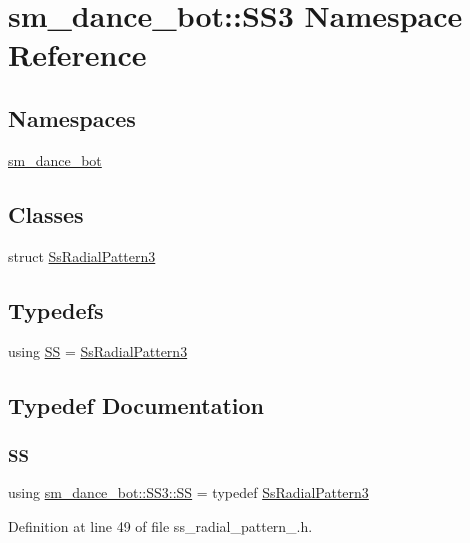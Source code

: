 \hypertarget{namespacesm__dance__bot_1_1SS3}{}\section{sm\+\_\+dance\+\_\+bot\+:\+:S\+S3 Namespace Reference}
\label{namespacesm__dance__bot_1_1SS3}
\subsection*{Namespaces}
\begin{DoxyCompactItemize}
\item 
 \hyperlink{namespacesm__dance__bot_1_1SS3_1_1sm__dance__bot}{sm\+\_\+dance\+\_\+bot}
\end{DoxyCompactItemize}
\subsection*{Classes}
\begin{DoxyCompactItemize}
\item 
struct \hyperlink{structsm__dance__bot_1_1SS3_1_1SsRadialPattern3}{Ss\+Radial\+Pattern3}
\end{DoxyCompactItemize}
\subsection*{Typedefs}
\begin{DoxyCompactItemize}
\item 
using \hyperlink{namespacesm__dance__bot_1_1SS3_aba7ea37bc21bc69fc2c374bd831c7ab1}{SS} = \hyperlink{structsm__dance__bot_1_1SS3_1_1SsRadialPattern3}{Ss\+Radial\+Pattern3}
\end{DoxyCompactItemize}


\subsection{Typedef Documentation}
\mbox{\label{namespacesm__dance__bot_1_1SS3_aba7ea37bc21bc69fc2c374bd831c7ab1}} 
\subsubsection{\texorpdfstring{SS}{SS}}
{\footnotesize\ttfamily using \hyperlink{namespacesm__dance__bot_1_1SS3_aba7ea37bc21bc69fc2c374bd831c7ab1}{sm\+\_\+dance\+\_\+bot\+::\+S\+S3\+::\+SS} = typedef \hyperlink{structsm__dance__bot_1_1SS3_1_1SsRadialPattern3}{Ss\+Radial\+Pattern3}}



Definition at line 49 of file ss\+\_\+radial\+\_\+pattern\+\_.\+h.

